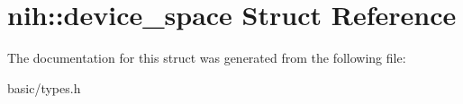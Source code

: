 \hypertarget{structnih_1_1device__space}{
\section{nih\-:\-:device\-\_\-space \-Struct \-Reference}
\label{structnih_1_1device__space}
}


\-The documentation for this struct was generated from the following file\-:\begin{DoxyCompactItemize}
\item 
basic/types.\-h\end{DoxyCompactItemize}
